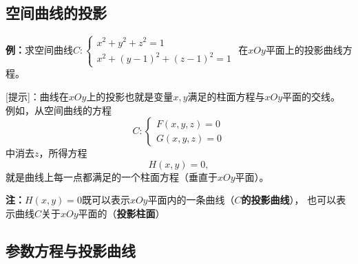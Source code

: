 \subsection{空间曲线的投影}

{\bf 例：}求空间曲线$C:\left\{\begin{array}{l}
	x^2+y^2+z^2=1\\ x^2+(y-1)^2+(z-1)^2=1
\end{array}\right.$
在$xOy$平面上的投影曲线方程。
\begin{center}
\end{center}

[提示]：曲线在$xOy$上的投影也就是变量$x,y$满足的柱面方程与$xOy$平面的交线。
例如，从空间曲线的方程
$$C:\left\{\begin{array}{l}
	F(x,y,z)=0\\ G(x,y,z)=0
\end{array}\right.$$
中消去$z$，所得方程
$$H(x,y)=0,$$
就是曲线上每一点都满足的一个柱面方程（垂直于$xOy$平面）。

{\bf 注：}$H(x,y)=0$既可以表示$xOy$平面内的一条曲线（{\bf $C$的投影曲线}），
也可以表示曲线$C$关于$xOy$平面的（{\bf 投影柱面}）

\subsection{参数方程与投影曲线}


